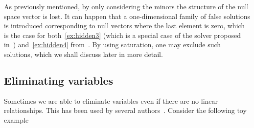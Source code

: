 \documentclass[11pt,a4paper]{article}
\theoremstyle{definition}
\begin{document}
As previously mentioned, by only considering the minors the structure of the null space
vector is lost.
It can happen that a one-dimensional family of false solutions is introduced corresponding
to null vectors where the last element is zero, which is the case for both~\cref{ex:hidden3}
(which is a special case of the solver proposed in~\cite{valtonenoernhag-etal-wacv-2021})
and~\cref{ex:hidden4} from~\cite{pritts2017}.
By using saturation, one may exclude such solutions, which we shall discuss later in more detail.

\subsection{Eliminating variables}
Sometimes we are able to eliminate variables even if there are no linear relationships. This
has been used by several authors~\cite{kukelova-etal-cviu-2010,fraundorfer-etal-eccv-2010,jiang-etal-accv-2014,kukelova-etal-cvpr-2015,valtonenoernhag-springer-2021}.
Consider the following toy example
\end{document}
